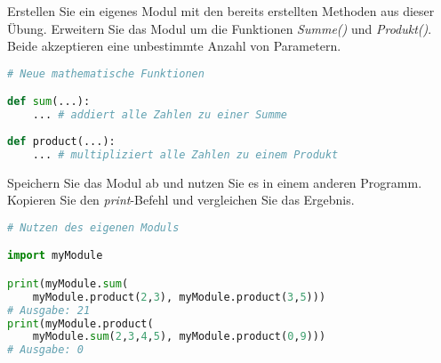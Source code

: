 Erstellen Sie ein eigenes Modul mit den bereits erstellten Methoden aus dieser Übung. Erweitern Sie das Modul um die Funktionen \emph{Summe()} und \emph{Produkt()}. Beide akzeptieren eine unbestimmte Anzahl von Parametern. 

\begin{lstlisting}[language=Python]
# Neue mathematische Funktionen

def sum(...):
	... # addiert alle Zahlen zu einer Summe
	
def product(...):
	... # multipliziert alle Zahlen zu einem Produkt
\end{lstlisting}

Speichern Sie das Modul ab und nutzen Sie es in einem anderen Programm. Kopieren Sie den \emph{print}-Befehl und vergleichen Sie das Ergebnis.

\begin{lstlisting}[language=Python]
# Nutzen des eigenen Moduls

import myModule

print(myModule.sum(
	myModule.product(2,3), myModule.product(3,5)))
# Ausgabe: 21
print(myModule.product(
	myModule.sum(2,3,4,5), myModule.product(0,9)))
# Ausgabe: 0

\end{lstlisting}
